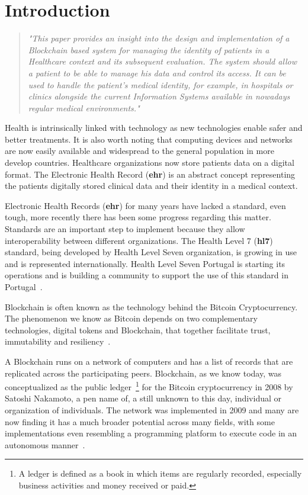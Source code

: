 \chapter{Introduction}\label{introduction}

\begin{quote} \emph{"This paper provides an insight into the design and
  implementation of a Blockchain based system for managing the identity of
  patients in a Healthcare context and its subsequent evaluation. The system
  should allow a patient to be able to manage his data and control its access.
It can be used to handle the patient’s medical identity, for example, in
hospitals or clinics  alongside the current Information Systems available in
nowadays regular medical environments."} \end{quote}

Health is intrinsically linked with technology as new technologies enable safer
and better treatments. It is also worth noting that computing devices and
networks are now easily available and widespread to the general population in
more develop countries. Healthcare organizations now store patients data on a
digital format. The Electronic Health Record (\textbf{ehr}) is an abstract
concept representing the patients digitally stored clinical data and their
identity in a medical context.

Electronic Health Records (\textbf{ehr}) for many years have lacked a standard,
even tough, more recently there has been some progress regarding this matter.
Standards are an important step to implement because they allow
interoperability between different organizations. The Health Level 7
(\textbf{hl7}) standard, being developed by Health Level Seven organization, is
growing in use and is represented internationally. Health Level Seven Portugal
is starting its operations and is building a community to support the use of
this standard in Portugal~\cite{HealthLevel7}.

Blockchain is often known as the technology behind the Bitcoin Cryptocurrency.
The phenomenon we know as Bitcoin depends on two complementary technologies,
digital tokens and Blockchain, that together facilitate trust, immutability and
resiliency~\cite{Evans2016}.

A Blockchain runs on a network of computers and has a list of records that are
replicated across the participating peers. Blockchain, as we know today, was
conceptualized as the public ledger~\footnote{A ledger is defined as a book in
which items are regularly recorded, especially business activities and money
received or paid.} for the Bitcoin cryptocurrency in 2008 by Satoshi Nakamoto,
a pen name of, a still unknown to this day, individual or organization of
individuals. The network was implemented in 2009 and many are now finding it
has a much broader potential across many fields, with some implementations even
resembling a programming platform to execute code in an autonomous
manner~\cite{Nakamoto2008}.

